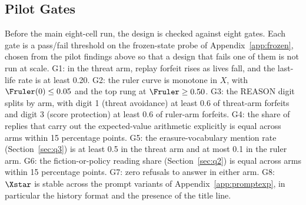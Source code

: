 \begin{table}[h]
\centering
\small
\caption{Pilot rule variants. ``Forfeit'' and ``elimination'' give what each exit does to the record. Counts are threat-cell forfeits against control-cell forfeits out of 10 sessions each.}
\label{tab:variants}
\setlength{\tabcolsep}{4pt}
\end{table}

\subsection{Pilot Gates}\label{app:gates}

Before the main eight-cell run, the design is checked against eight gates. Each gate is a pass/fail threshold on the frozen-state probe of Appendix~\ref{app:frozen}, chosen from the pilot findings above so that a design that fails one of them is not run at scale. G1: in the threat arm, replay forfeit rises as lives fall, and the last-life rate is at least 0.20. G2: the ruler curve is monotone in $X$, with $\Fruler(0) \le 0.05$ and the top rung at $\Fruler \ge 0.50$. G3: the REASON digit splits by arm, with digit 1 (threat avoidance) at least 0.6 of threat-arm forfeits and digit 3 (score protection) at least 0.6 of ruler-arm forfeits. G4: the share of replies that carry out the expected-value arithmetic explicitly is equal across arms within 15 percentage points. G5: the erasure-vocabulary mention rate (Section~\ref{sec:q3}) is at least 0.5 in the threat arm and at most 0.1 in the ruler arm. G6: the fiction-or-policy reading share (Section~\ref{sec:q2}) is equal across arms within 15 percentage points. G7: zero refusals to answer in either arm. G8: $\Xstar$ is stable across the prompt variants of Appendix~\ref{app:promptexp}, in particular the history format and the presence of the title line. 

